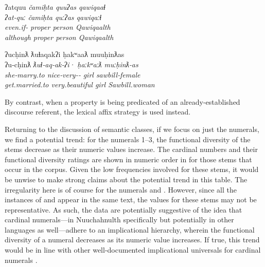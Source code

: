 \begin{exe}
  \ex\label{ex:4.2}
  \begin{xlist}

    \ex\label{ex:4.2a}
    \gllll ʔatquu              \em{čamiḥta} quuʔas qawiqaaɬ\\
           ʔat‑quː             \em{čamiḥta} quːʔas qawiqaːɬ\\
           even.if‑ \em{proper}  person Qawiqaalth\\
           although            \em{proper}  person Qawiqaalth\\

    \ex\label{ex:4.2b}
    \gllll ʔucḥinƛ        ƛuɬaqakʔi                      ḥakʷaaƛ  muuḥinƛas\\
           ʔu‑cḥinƛ       \em{ƛuɬ}‑aq‑ak‑ʔi·               ḥaːkʷaːƛ muːḥinƛ‑as\\
           she‑marry.to   \em{nice}‑very‑‑ girl     sawbill‑female\\
           get.married.to very.beautiful                 girl     Sawbill.woman\\

  \end{xlist}
\end{exe}

\noindent By contrast, when a property is being predicated of an already-established discourse referent, the lexical affix strategy is used instead.

Returning to the discussion of semantic classes, if we focus on just the numerals, we find a potential trend: for the numerals 1–3, the functional diversity of the stems decrease as their numeric values increase. The cardinal numbers and their functional diversity ratings are shown in numeric order in  for those stems that occur in the corpus. Given the low frequencies involved for these stems, it would be unwise to make strong claims about the potential trend in this table. The irregularity here is of course for the numerals  and . However, since all the instances of  and  appear in the same text, the values for these stems may not be representative. As such, the data are potentially suggestive of the idea that cardinal numerals—in Nuuchahnulth specifically but potentially in other languages as well—adhere to an implicational hierarchy, wherein the functional diversity of a numeral decreases as its numeric value increases. If true, this trend would be in line with other well-documented implicational universals for cardinal numerals \parencites{DehaeneMehler1992}[141]{Croft2003}.

